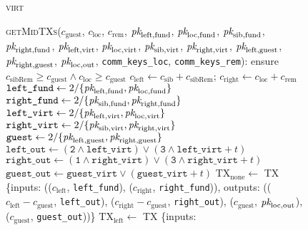 \begin{figure}[H]
  \begin{processbox}{\textsc{virt}}
    \begin{algorithmic}[1]
      \State \textsc{getMidTXs}($c_{\mathrm{guest}}$, $c_{\mathrm{loc}}$,
      $c_{\mathrm{rem}}$, $\textit{pk}_{\mathrm{left}, \mathrm{fund}}$,
      $\textit{pk}_{\mathrm{loc}, \mathrm{fund}}$, $\textit{pk}_{\mathrm{sib}, \mathrm{fund}}$,
      $\textit{pk}_{\mathrm{right}, \mathrm{fund}}$, $\textit{pk}_{\mathrm{left}, \mathrm{virt}}$,
      $\textit{pk}_{\mathrm{loc}, \mathrm{virt}}$, $\textit{pk}_{\mathrm{sib}, \mathrm{virt}}$,
      $\textit{pk}_{\mathrm{right}, \mathrm{virt}}$, $\textit{pk}_{\mathrm{left},
      \mathrm{guest}}$, $\textit{pk}_{\mathrm{right}, \mathrm{guest}}$,
      $\textit{pk}_{\mathrm{loc}, \mathrm{out}}$, \texttt{comm\_keys\_loc},
      \texttt{comm\_keys\_rem}):
      \Indent
        \State ensure $c_{\mathrm{sibRem}} \geq c_{\mathrm{guest}} \wedge
        c_{\mathrm{loc}} \geq c_{\mathrm{guest}}$
        \State $c_{\mathrm{left}} \gets c_{\mathrm{sib}} + c_{\mathrm{sibRem}}$;
        $c_{\mathrm{right}} \gets c_{\mathrm{loc}} + c_{\mathrm{rem}}$
        \State $\texttt{left\_fund} \gets 2/\{\textit{pk}_{\mathrm{left}, \mathrm{fund}},
        \textit{pk}_{\mathrm{loc}, \mathrm{fund}}\}$
        \State $\texttt{right\_fund} \gets 2/\{\textit{pk}_{\mathrm{sib}, \mathrm{fund}},
        \textit{pk}_{\mathrm{right}, \mathrm{fund}}\}$
        \State $\texttt{left\_virt} \gets 2/\{\textit{pk}_{\mathrm{left}, \mathrm{virt}},
        \textit{pk}_{\mathrm{loc}, \mathrm{virt}}\}$
        \State $\texttt{right\_virt} \gets 2/\{\textit{pk}_{\mathrm{sib}, \mathrm{virt}},
        \textit{pk}_{\mathrm{right}, \mathrm{virt}}\}$
        \State $\texttt{guest} \gets 2/\{\textit{pk}_{\mathrm{left}, \mathrm{guest}},
        \textit{pk}_{\mathrm{right}, \mathrm{guest}}\}$
        \State $\texttt{left\_out} \gets (\texttt{2} \wedge \texttt{left\_virt})
        \vee (\texttt{3} \wedge \texttt{left\_virt} + t)$
        \State $\texttt{right\_out} \gets (\texttt{1} \wedge
        \texttt{right\_virt}) \vee (\texttt{3} \wedge \texttt{right\_virt} + t)$
        \State $\texttt{guest\_out} \gets \texttt{guest\_virt} \vee
        (\texttt{guest\_virt} + t)$
        \State $\mathrm{TX}_{\mathrm{none}} \gets$ TX \{inputs:
        (($c_{\mathrm{left}}$, \texttt{left\_fund}), ($c_{\mathrm{right}}$,
        \texttt{right\_fund})), outputs: (($c_{\mathrm{left}} -
        c_{\mathrm{guest}}$, \texttt{left\_out}), ($c_{\mathrm{right}} -
        c_{\mathrm{guest}}$, \texttt{right\_out}), ($c_{\mathrm{guest}}$,
        $\textit{pk}_{\mathrm{loc}, \mathrm{out}}$), ($c_{\mathrm{guest}}$,
        \texttt{guest\_out}))\}
        \State $\mathrm{TX}_{\mathrm{left}} \gets$ TX \{inputs:

\end{algorithmic}
\end{processbox}
\end{figure}
